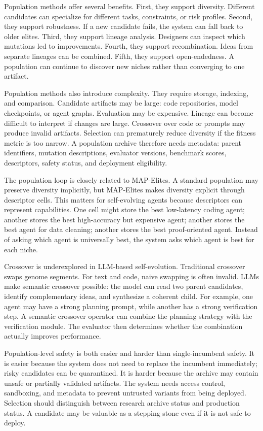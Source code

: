 Population methods offer several benefits.  First, they support diversity.  Different candidates can specialize for different tasks, constraints, or risk profiles.  Second, they support robustness.  If a new candidate fails, the system can fall back to older elites.  Third, they support lineage analysis.  Designers can inspect which mutations led to improvements.  Fourth, they support recombination.  Ideas from separate lineages can be combined.  Fifth, they support open-endedness.  A population can continue to discover new niches rather than converging to one artifact.

Population methods also introduce complexity.  They require storage, indexing, and comparison.  Candidate artifacts may be large: code repositories, model checkpoints, or agent graphs.  Evaluation may be expensive.  Lineage can become difficult to interpret if changes are large.  Crossover over code or prompts may produce invalid artifacts.  Selection can prematurely reduce diversity if the fitness metric is too narrow.  A population archive therefore needs metadata: parent identifiers, mutation descriptions, evaluator versions, benchmark scores, descriptors, safety status, and deployment eligibility.

The population loop is closely related to MAP-Elites.  A standard population may preserve diversity implicitly, but MAP-Elites makes diversity explicit through descriptor cells.  This matters for self-evolving agents because descriptors can represent capabilities.  One cell might store the best low-latency coding agent; another stores the best high-accuracy but expensive agent; another stores the best agent for data cleaning; another stores the best proof-oriented agent.  Instead of asking which agent is universally best, the system asks which agent is best for each niche.

Crossover is underexplored in LLM-based self-evolution.  Traditional crossover swaps genome segments.  For text and code, naive swapping is often invalid.  LLMs make semantic crossover possible: the model can read two parent candidates, identify complementary ideas, and synthesize a coherent child.  For example, one agent may have a strong planning prompt, while another has a strong verification step.  A semantic crossover operator can combine the planning strategy with the verification module.  The evaluator then determines whether the combination actually improves performance.

Population-level safety is both easier and harder than single-incumbent safety.  It is easier because the system does not need to replace the incumbent immediately; risky candidates can be quarantined.  It is harder because the archive may contain unsafe or partially validated artifacts.  The system needs access control, sandboxing, and metadata to prevent untrusted variants from being deployed.  Selection should distinguish between research archive status and production status.  A candidate may be valuable as a stepping stone even if it is not safe to deploy.

